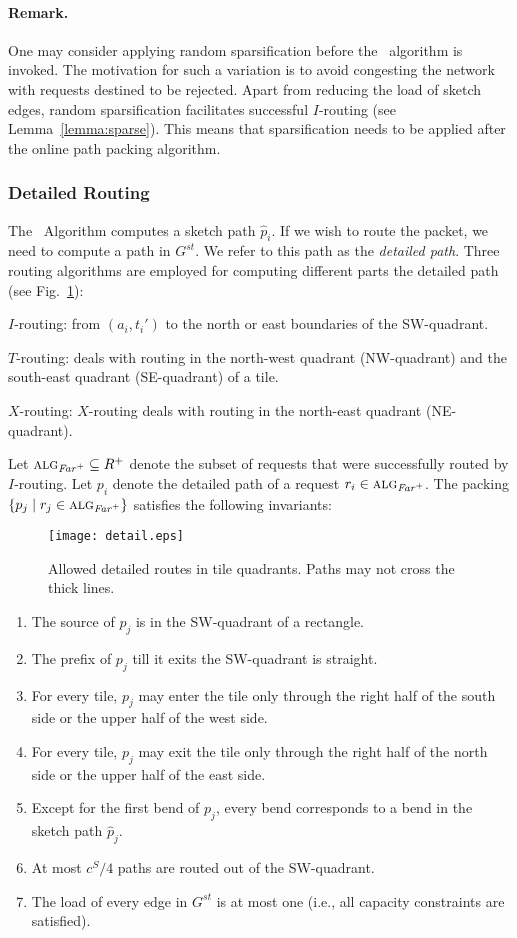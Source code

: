 \documentclass[11pt]{article}
\newcommand{\route}{\text{\sc{ipp}}}
\newcommand{\IPP}{\route}
\newcommand{\alg}{\text{\sc{alg}}}
\newenvironment{proof sketch}[1]{\noindent {\emph{Proof sketch of #1:}}}{\hfill \qed}
\newcommand{\far}{\text{\emph{Far}}}
\newcommand{\algf}{\alg_{\far^+}}
\newcommand{\algfar}{\algf}
\begin{document}
\paragraph{Remark.}
One may consider applying random sparsification before the \route\ algorithm is
  invoked. The motivation for such a variation is to avoid congesting the network
  with requests destined to be rejected. Apart from reducing the load of sketch
  edges, random sparsification facilitates successful $I$-routing (see
  Lemma~\ref{lemma:sparse}). This means that sparsification needs to be applied after
  the online path packing algorithm.

\subsubsection{Detailed Routing}\label{sec:detail}
The \IPP\ Algorithm computes a sketch path $\hat p_i$. If we wish to
route the packet, we need to compute a path in $G^{st}$. We refer
to this path as the \emph{detailed path}.
Three routing algorithms are employed for computing different parts the detailed path (see Fig.~\ref{fig:detail}):
\begin{inparaenum}[(1)]
  \item $I$-routing: from $(a_i, t_i')$ to the north or east boundaries of the SW-quadrant.
  \item $T$-routing: deals with routing in the north-west quadrant (NW-quadrant) and  the south-east quadrant (SE-quadrant) of a tile.
  \item $X$-routing: $X$-routing deals with routing in the north-east quadrant (NE-quadrant).
\end{inparaenum}
Let $\algfar\subseteq R^+$ denote the subset of requests that were successfully routed by $I$-routing.
Let $p_i$ denote the detailed path of a request $r_i\in \algfar$.
The packing $\{p_j \mid r_j\in \algfar\}$ satisfies the following
invariants:
    \begin{figure}[h]
      \centering
        \texttt{[image: detail.eps]}
      \caption{Allowed detailed routes in tile quadrants. Paths may not
        cross the thick lines.}
      \label{fig:detail}
    \end{figure}
\begin{enumerate}
\item The source of $p_j$ is in the SW-quadrant of a rectangle.
\item The prefix of $p_j$ till it exits the SW-quadrant is straight.
\item For every tile, $p_j$ may enter the tile only through the right half of the south side or the upper half of the west side.
\item For every tile, $p_j$ may exit the tile only through the right half of the north side  or the upper half of the east side.
\item Except for the first bend of $p_j$, every bend
    corresponds to a bend in the sketch path $\hat p_j$.
\item At most $c^S/4$ paths are routed out of the
    SW-quadrant.
\item The load of every edge in $G^{st}$ is at most one (i.e., all capacity constraints are satisfied).
\end{enumerate}
\end{document}
